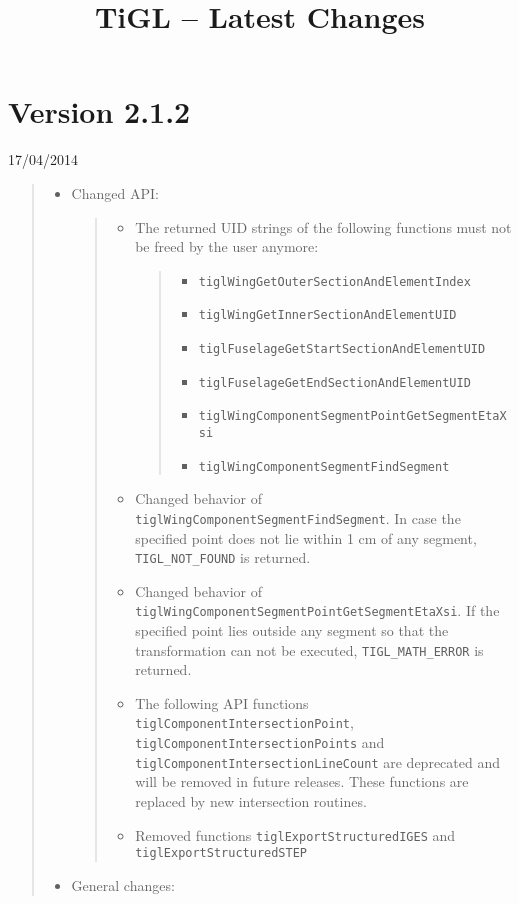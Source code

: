 \documentclass[]{scrartcl}
\author{}
\date{}
\begin{document}
\title{TiGL -- Latest Changes} \maketitle

\section{Version 2.1.2}\label{version-2.1.2}

17/04/2014

\begin{quote}
\begin{itemize}
\item
  Changed API:

  \begin{quote}
  \begin{itemize}
  \item
    The returned UID strings of the following functions must not be
    freed by the user anymore:

    \begin{quote}
    \begin{itemize}
    \itemsep1pt\parskip0pt
    \item
      \texttt{tiglWingGetOuterSectionAndElementIndex}
    \item
      \texttt{tiglWingGetInnerSectionAndElementUID}
    \item
      \texttt{tiglFuselageGetStartSectionAndElementUID}
    \item
      \texttt{tiglFuselageGetEndSectionAndElementUID}
    \item
      \texttt{tiglWingComponentSegmentPointGetSegmentEtaXsi}
    \item
      \texttt{tiglWingComponentSegmentFindSegment}
    \end{itemize}
    \end{quote}
  \item
    Changed behavior of \texttt{tiglWingComponentSegmentFindSegment}. In
    case the specified point does not lie within 1 cm of any segment,
    \texttt{TIGL\_NOT\_FOUND} is returned.
  \item
    Changed behavior of
    \texttt{tiglWingComponentSegmentPointGetSegmentEtaXsi}. If the
    specified point lies outside any segment so that the transformation
    can not be executed, \texttt{TIGL\_MATH\_ERROR} is returned.
  \item
    The following API functions \texttt{tiglComponentIntersectionPoint},
    \texttt{tiglComponentIntersectionPoints} and
    \texttt{tiglComponentIntersectionLineCount} are deprecated and will
    be removed in future releases. These functions are replaced by new
    intersection routines.
  \item
    Removed functions \texttt{tiglExportStructuredIGES} and
    \texttt{tiglExportStructuredSTEP}
  \end{itemize}
  \end{quote}
\item
  General changes:


\end{itemize}
\end{quote}
\end{document}
